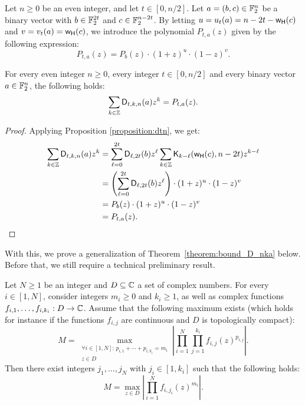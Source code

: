 \documentclass[11pt]{llncs}
\begin{document}
\begin{definition}\label{defi:P_a_t}
    Let $n\geq 0$ be an even integer, and let $t\in[0,n/2]$. Let $a=(b,c)\in\mathbb{F}_2^n$ be a binary vector with $b\in\mathbb{F}_2^{2t}$ and $c\in\mathbb{F}_2^{n-2t}$. By letting $u=u_t(a)=n-2t-\mathsf{w_H}(c)$ and $v=v_t(a)=\mathsf{w_H}(c)$, we introduce the polynomial $P_{t,a}(z)$ given by the following expression:
    \[
        P_{t,a}(z)=P_b(z)\cdot(1+z)^u\cdot(1-z)^v.
    \]
\end{definition}

\begin{proposition}
    For every even integer $n\geq 0$, every integer $t\in[0,n/2]$ and every binary vector $a\in\mathbb{F}_2^n$, the following holds:
    \[
        \sum_{k\in\mathbb{Z}}\mathsf{D}_{t,k,n}(a)z^k=P_{t,a}(z).
    \]
\end{proposition}

\begin{proof}
    Applying Proposition \ref{proposition:dtn}, we get:
    \begin{align*}
        \sum_{k\in\mathbb{Z}}\mathsf{D}_{t,k,n}(a)z^k&=\sum_{\ell=0}^{2t}\mathsf{D}_{\ell,2t}(b)z^\ell\sum_{k\in\mathbb{Z}}\mathsf{K}_{k-\ell}(\mathsf{w_H}(c),n-2t)z^{k-\ell}\\
        &=\left(\sum_{\ell=0}^{2t}\mathsf{D}_{\ell,2t}(b)z^\ell\right)\cdot(1+z)^u\cdot(1-z)^v\\
        &=P_b(z)\cdot(1+z)^u\cdot(1-z)^v\\
        &=P_{t,a}(z).\qedhere
    \end{align*}
\end{proof}

With this, we prove a generalization of Theorem~\ref{theorem:bound_D_nka} below. Before that, we still require a technical preliminary result.

\begin{lemma}\label{lemma:maximizing_args}
    Let $N\geq 1$ be an integer and $D\subseteq\mathbb{C}$ a set of complex numbers. For every $i\in[1,N]$, consider integers $m_i\geq 0$ and $k_i\geq 1$, as well as complex functions $f_{i,1},\dots,f_{i,k_i}:D\to\mathbb{C}$. Assume that the following maximum exists (which holds for instance if the functions $f_{i,j}$ are continuous and $D$ is topologically compact):
    \[
        M=\max_{\substack{\forall i\in[1,N]:\,p_{i,1}+\cdots+p_{i,k_i}=m_i\\z\in D}}\left|\prod_{i=1}^N\prod_{j=1}^{k_i}f_{i,j}(z)^{p_{i,j}}\right|.
    \]
    Then there exist integers $j_1,\dots,j_N$ with $j_i\in[1,k_i]$ such that the following holds:
    \[
        M=\max_{z\in D}\left|\prod_{i=1}^Nf_{i,j_i}(z)^{m_i}\right|.
    \]
\end{lemma}
\end{document}
